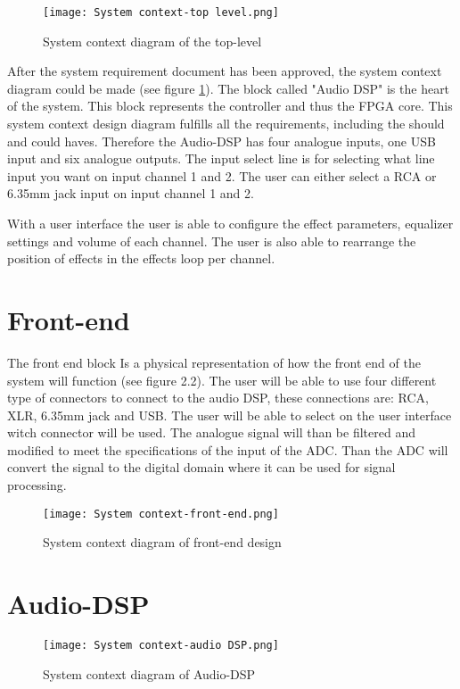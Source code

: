 \begin{figure}[ht]
    \texttt{[image: System context-top level.png]}
    \caption{System context diagram of the top-level}
    \label{fig:sys-context-top}
\end{figure}

After the system requirement document has been approved, the system context diagram could be made (see figure \ref{fig:sys-context-top}). The block called "Audio DSP" is the heart of the system. This block represents the controller and thus the FPGA core. This system context design diagram fulfills all the requirements, including the should and could haves. Therefore the Audio-DSP has four analogue inputs, one USB input and six analogue outputs. The input select line is for selecting what line input you want on input channel 1 and 2. The user can either select a RCA or 6.35mm jack input on input channel 1 and 2.

With a user interface the user is able to configure the effect parameters, equalizer settings and volume of each channel. The user is also able to rearrange the position of effects in the effects loop per channel.

\section{Front-end}

The front end block Is a physical representation of how the front end of the system will function (see figure 2.2). The user will be able to use four different type of connectors to connect to the audio DSP, these connections are: RCA, XLR, 6.35mm jack and USB. The user will be able to select on the user interface witch connector will be used. The analogue signal will than be filtered and modified to meet the specifications of the input of the ADC. Than the ADC will convert the signal to the digital domain where it can be used for signal processing. 

\begin{figure}[ht]
    \texttt{[image: System context-front-end.png]}
    \caption{System context diagram of front-end design}
    \label{fig:system-context-front-end}
\end{figure}

\section{Audio-DSP}
\begin{figure}[ht]
    \texttt{[image: System context-audio DSP.png]}
    \caption{System context diagram of Audio-DSP}
    \label{fig:sys-context-audio-dsp}
\end{figure}


